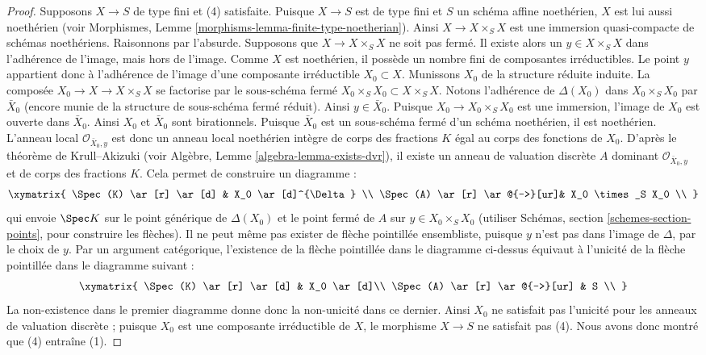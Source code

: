 \begin{proof}
\medskip\noindent
Supposons $X \to S$ de type fini et (4) satisfaite.
Puisque $X \to S$ est de type fini et $S$ un schéma affine
noethérien, $X$ est lui aussi noethérien (voir
Morphismes, Lemme \ref{morphisms-lemma-finite-type-noetherian}).
Ainsi $X \to X \times_S X$ est
une immersion quasi-compacte de schémas noethériens. Raisonnons par
l'absurde. Supposons que $X \to X \times_S X$ ne soit pas fermé.
Il existe alors un $y \in X \times_S X$ dans l'adhérence de l'image, mais
hors de l'image. Comme $X$ est noethérien, il possède un nombre fini de composantes
irréductibles. Le point $y$ appartient donc à l'adhérence de l'image d'une
composante irréductible $X_0 \subset X$. Munissons $X_0$ de la structure
réduite induite. La composée $X_0 \to X \to X \times_S X$
se factorise par le sous-schéma fermé $X_0 \times_S X_0 \subset X \times_S X$.
Notons l'adhérence de $\Delta(X_0)$ dans $X_0 \times_S X_0$
par $\bar X_0$ (encore munie de la structure de sous-schéma fermé réduit). Ainsi $y \in \bar X_0$.
Puisque $X_0 \to X_0 \times_S X_0$ est une immersion, l'image de $X_0$
est ouverte dans $\bar X_0$. Ainsi $X_0$ et $\bar X_0$ sont
birationnels. Puisque $\bar{X}_0$ est un sous-schéma fermé d'un
schéma noethérien, il est noethérien. L'anneau local
$\mathcal O_{{\bar X_0, y}}$ est donc un anneau local noethérien intègre de corps des
fractions $K$ égal au corps des fonctions de $X_0$. D'après le théorème de Krull--Akizuki
(voir Algèbre, Lemme \ref{algebra-lemma-exists-dvr}), il existe un
anneau de valuation discrète $A$ dominant $\mathcal O_{{\bar X_0, y}}$
et de corps des fractions $K$. Cela permet de construire un diagramme :
\begin{equation}
\label{equation-valuative-generic}
\xymatrix{
\Spec(K) \ar[r] \ar[d] & X_0 \ar[d]^{\Delta} \\
\Spec(A) \ar[r] \ar@{-->}[ur]& X_0 \times_S X_0 \\
}
\end{equation}
qui envoie $\Spec K$ sur le point générique de $\Delta(X_0)$ et
le point fermé de $A$ sur $y \in X_0 \times_S X_0$ (utiliser
Schémas, section \ref{schemes-section-points}, pour construire les flèches).
Il ne peut même pas exister de
flèche pointillée ensembliste, puisque $y$ n'est pas dans l'image de
$\Delta$, par le choix de $y$. Par un argument catégorique, l'existence
de la flèche pointillée dans le diagramme ci-dessus équivaut à l'unicité
de la flèche pointillée dans le diagramme suivant :
\begin{equation}
\label{equation-valuative-nonexistent}
\xymatrix{
\Spec(K) \ar[r] \ar[d] & X_0 \ar[d]\\
\Spec(A) \ar[r] \ar@{-->}[ur] & S \\
}
\end{equation}
La non-existence dans le premier diagramme donne donc la non-unicité dans
ce dernier. Ainsi $X_0$ ne satisfait pas
l'unicité pour les anneaux de valuation discrète ; puisque $X_0$ est une
composante irréductible de $X$, le morphisme $X \to S$ ne satisfait pas
(4). Nous avons donc montré que (4) entraîne (1).
\end{proof}

